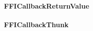 \documentclass[a4paper,10pt,twoside]{book}
\begin{document}
\paragraph{FFICallbackReturnValue} 
% 


\paragraph{FFICallbackThunk} 

% 
% 
\end{document}

